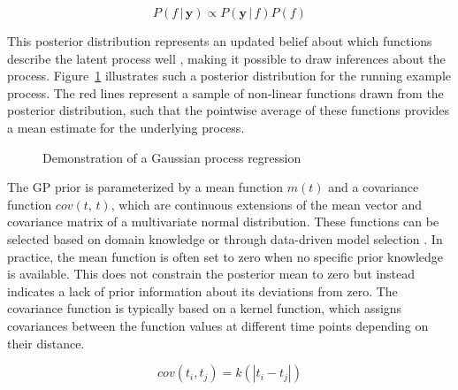 \documentclass[man, floatsintext]{apa7}
\begin{document}
\begin{equation}
  P(f \, | \, \textbf{y})  \propto P(\textbf{y} \, | \, f) P(f)
\end{equation}

\noindent This posterior distribution represents an updated belief about which
functions describe the latent process well \parencite{kruschke_doing_2011},
making it possible to draw inferences about the process.
Figure~\ref{fig:gp_dem} illustrates such a posterior distribution for the
running example process. The red lines represent a sample of non-linear
functions drawn from the posterior distribution, such that the pointwise
average of these functions provides a mean estimate for the underlying process.

\begin{figure}[!t]
  \caption{Demonstration of a Gaussian process regression}
  \label{fig:gp_dem}
\end{figure}

The GP prior is parameterized by a mean function $m(t)$ and a covariance
function $cov(t, \, t)$, which are continuous extensions of the mean vector and
covariance matrix of a multivariate normal distribution. These functions can be
selected based on domain knowledge or through data-driven model selection
\parencite{richardson_gaussian_2017, abdessalem_automatic_2017}. In practice,
the mean function is often set to zero when no specific prior knowledge is
available. This does not constrain the posterior mean to zero but instead
indicates a lack of prior information about its deviations from zero. The
covariance function is typically based on a kernel function, which assigns
covariances between the function values at different time points depending on
their distance.

\begin{equation}
  cov(t_i, t_j) = k(|t_i - t_j|)
\end{equation}
\end{document}
